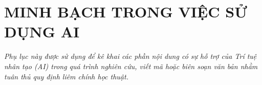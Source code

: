 \chapter{MINH BẠCH TRONG VIỆC SỬ DỤNG AI}
\textit{Phụ lục này được sử dụng để kê khai các phần nội dung có sự hỗ trợ của Trí tuệ nhân tạo (AI)
trong quá trình nghiên cứu, viết mã hoặc biên soạn văn bản nhằm tuân thủ quy định liêm chính học thuật.}
